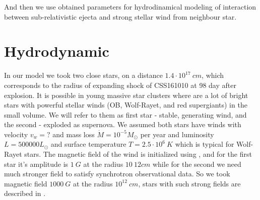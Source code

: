 \documentclass{article}
\begin{document}
	
	And then we use obtained parameters for hydrodinamical modeling of interaction between sub-relativistic ejecta and strong stellar wind from neighbour star.
	
	
	\section{Hydrodynamic}\label{hydrodynamic}
	In our model we took two close stars, on a distance $1.4\cdot10^{17}~cm$, which corresponds to the radius of expanding shock of CSS161010 at 98 day after explosion. It is  possible in young massive star clusters where are a lot of bright stars with powerful stellar winds (OB, Wolf-Rayet, and red supergiants) in the small volume. We will refer to them as first star - stable, generating wind, and the second - exploded as supernova. We assumed both stars have winds with velocity $v_w = ?$ and mass loss $\dot{M} = 10^{-5} M_\odot $ per year and luminosity $L=500000 L_\odot$ and surface temperature $T = 2.5\cdot10^6~K$ which is typical for Wolf-Rayet stars. The magnetic field of the wind is initialized using \cite{Bjorkman1993}, and for the first star  it's amplitude is $1~G$ at the radius $10~12 cm$ while for the second we need much stronger field to satisfy synchrotron observational data. So we took magnetic field $1000~G$ at the radius $10^{12}~cm$, stars with such strong fields are described in \cite{}.
	
\end{document}
